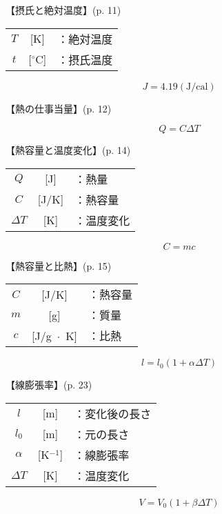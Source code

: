 \documentclass[10pt]{jarticle}
\begin{document}
\vskip3mm
【摂氏と絶対温度】{\footnotesize (p. 11)}

\begin{tabular}{ccl}
$T$	&[K]	&：絶対温度\\
$t$	&[$^\circ$C]	&：摂氏温度
\end{tabular}



\newpage
\[
	J =4.19 \mathrm{(J / cal)}
\]


\vskip3mm
【熱の仕事当量】{\footnotesize (p. 12)}




\newpage
\[
	Q = C \mathit{\Delta} T
\]


\vskip3mm
【熱容量と温度変化】{\footnotesize (p. 14)}

\begin{tabular}{ccl}
$Q$	&[J]	&：熱量\\
$C$	&[J/K]	&：熱容量\\
$\mathit{\Delta} T$	& [K]	&：温度変化
\end{tabular}

\newpage





\newpage
\[
	C = m c
\]


\vskip3mm
【熱容量と比熱】{\footnotesize (p. 15)}

\begin{tabular}{ccl}
$C$	&[J/K]	&：熱容量\\
$m$	&[g]	&：質量\\
$c$	&[J/g $\!\! \cdot \!\! $ K]	&：比熱
\end{tabular}

\newpage




\newpage
\[
	l = l_0 (1+ \alpha \mathit{\Delta}T)
\]


\vskip3mm
【線膨張率】{\footnotesize (p. 23)}

\begin{tabular}{ccl}
$l$	&[m]	&：変化後の長さ\\
$l_0$	&[m]	&：元の長さ\\
$\alpha$	&[K$^{-1}$]	&：線膨張率\\
$\mathit{\Delta} T$	& [K]	&：温度変化
\end{tabular}



\newpage
\[
	V = V_0 (1+ \beta \mathit{\Delta}T)
\]
\end{document}
